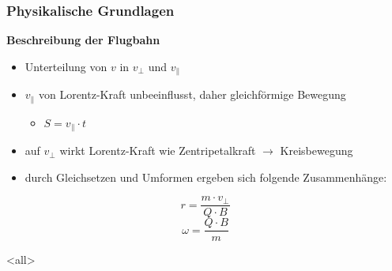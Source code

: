 \begin{frame}
  \frametitle{Physikalische Grundlagen}
  \textbf{Beschreibung der Flugbahn}
  \begin{itemize}
    \item Unterteilung von \(v\) in \(v_\perp\) und \(v_\parallel\)
    \item \(v_\parallel\) von Lorentz-Kraft unbeeinflusst, daher gleichf\"ormige Bewegung
      \begin{itemize}
        \item \(S = v_\parallel \cdot t\)
      \end{itemize}
    \item auf \(v_\perp\) wirkt Lorentz-Kraft wie Zentripetalkraft \(\rightarrow\) Kreisbewegung
    \item durch Gleichsetzen und Umformen ergeben sich folgende Zusammenh\"ange:
  \end{itemize}
  \begin{equation*}
    \label{eq:radius}
    r = \frac{m \cdot v_\perp}{Q \cdot B}
  \end{equation*}
  \begin{equation*}
    \label{eq:omega}
    \omega = \frac{Q \cdot B}{m}
  \end{equation*}
\end{frame}
\mode<all>
